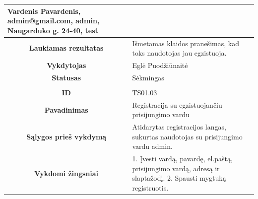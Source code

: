 \documentclass{VUMIFPSkursinis}
\begin{document}
\begin{table}[H]
\begin{tabular}{|p{6cm}|p{11cm}|}
			{Vardenis Pavardenis, admin@gmail.com, admin, Naugarduko g. 24-40, test}\\
			\hline
			\multicolumn{1}{|c|}{{\bfseries Laukiamas rezultatas}}&
			{Išmetamas klaidos pranešimas, kad toks naudotojas jau egzistuoja.}\\
			\hline
			\multicolumn{1}{|c|}{{\bfseries Vykdytojas}}&
			{Eglė Puodžiūnaitė}\\
			\hline
			\multicolumn{1}{|c|}{{\bfseries Statusas}}&
			{Sėkmingas}\\
			\hline
			\rowcolor{lightgray}
			\multicolumn{2}{|c|}{}\\
			\hline
			\multicolumn{1}{|c|}{{\bfseries ID}}&
			{TS01.03}\\
			\hline
			\multicolumn{1}{|c|}{{\bfseries Pavadinimas}}&
			{Registracija su egzistuojančiu prisijungimo vardu}\\
			\hline
			\multicolumn{1}{|c|}{{\bfseries Sąlygos prieš vykdymą}}&
			{Atidarytas registracijos langas, sukurtas naudotojas su prisijungimo vardu admin.}\\
			\hline
			\multicolumn{1}{|c|}{{\bfseries Vykdomi žingsniai}}&
			{1. Įvesti vardą, pavardę, el.paštą, prisijungimo vardą, adresą ir slaptažodį.
			 2. Spausti mygtuką registruotis.}\\
			\hline
		\end{tabular}
		\label{registracija}
	\end{table}			
\end{document}
